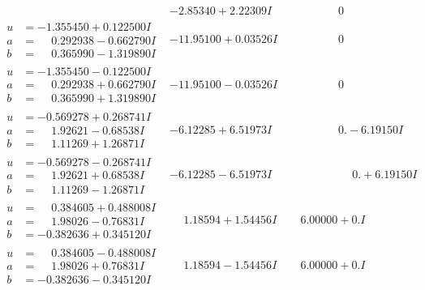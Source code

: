 \documentclass[1p]{elsarticle_modified}
\theoremstyle{definition}
\begin{document}
$$\begin{array}{c|c|c}
 & -2.85340 + 2.22309 I & \phantom{-0.000000 } 0 \\ \hline\begin{aligned}
u &= -1.355450 + 0.122500 I \\
a &= \phantom{-}0.292938 - 0.662790 I \\
b &= \phantom{-}0.365990 - 1.319890 I\end{aligned}
 & -11.95100 + 0.03526 I & \phantom{-0.000000 } 0 \\ \hline\begin{aligned}
u &= -1.355450 - 0.122500 I \\
a &= \phantom{-}0.292938 + 0.662790 I \\
b &= \phantom{-}0.365990 + 1.319890 I\end{aligned}
 & -11.95100 - 0.03526 I & \phantom{-0.000000 } 0 \\ \hline\begin{aligned}
u &= -0.569278 + 0.268741 I \\
a &= \phantom{-}1.92621 - 0.68538 I \\
b &= \phantom{-}1.11269 + 1.26871 I\end{aligned}
 & -6.12285 + 6.51973 I & \phantom{-0.000000 } 0. - 6.19150 I \\ \hline\begin{aligned}
u &= -0.569278 - 0.268741 I \\
a &= \phantom{-}1.92621 + 0.68538 I \\
b &= \phantom{-}1.11269 - 1.26871 I\end{aligned}
 & -6.12285 - 6.51973 I & \phantom{-0.000000 -}0. + 6.19150 I \\ \hline\begin{aligned}
u &= \phantom{-}0.384605 + 0.488008 I \\
a &= \phantom{-}1.98026 - 0.76831 I \\
b &= -0.382636 + 0.345120 I\end{aligned}
 & \phantom{-}1.18594 + 1.54456 I & \phantom{-}6.00000 + 0. I\phantom{ +0.000000I} \\ \hline\begin{aligned}
u &= \phantom{-}0.384605 - 0.488008 I \\
a &= \phantom{-}1.98026 + 0.76831 I \\
b &= -0.382636 - 0.345120 I\end{aligned}
 & \phantom{-}1.18594 - 1.54456 I & \phantom{-}6.00000 + 0. I\phantom{ +0.000000I} \\ \hline\begin{aligned}

\end{aligned}
\end{array}$$
\end{document}
